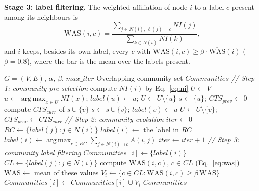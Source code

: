 \documentclass[conference]{IEEEtran}
\newcommand{\algcomment}[1]{\Statex \textit{// #1}}
\DeclareMathOperator*{\argmax}{arg\,max}
\begin{document}
\textbf{Stage 3: label filtering.} The weighted affiliation of node $i$ to a label $c$ present among its neighbours is
\begin{equation}
\mathrm{WAS}(i,c)=\frac{\sum_{j\in N(i),\,\ell(j)=c}NI(j)}{\sum_{k\in N(i)}NI(k)},\label{eq:was}
\end{equation}
and $i$ keeps, besides its own label, every $c$ with $\mathrm{WAS}(i,c)\ge\beta\cdot\overline{\mathrm{WAS}}(i)$ ($\beta=0.8$), where the bar is the mean over the labels present.

\begin{algorithm}[t]
\footnotesize
\caption{TPOC-LPA (baseline, after~\cite{kong2026})}\label{alg:base}
\begin{algorithmic}[1]
\Require $G=(V,E)$, $\alpha$, $\beta$, $max\_iter$
\Ensure Overlapping community set $Communities$
\algcomment{Step 1: community pre-selection}
 compute $NI(i)$ by Eq.~\eqref{eq:ni} \EndFor
\State $U\gets V$
  \State $u\gets\argmax_{x\in U}NI(x)$; $label(u)\gets u$; $U\gets U\setminus\{u\}$
  \State $s\gets\{u\}$; $CTS_{prev}\gets0$
    \State compute $CTS_{curr}$ of $s\cup\{v\}$
      \State $s\gets s\cup\{v\}$; $label(v)\gets u$
      \State $U\gets U\setminus\{v\}$; $CTS_{prev}\gets CTS_{curr}$
    \EndIf
  \EndFor
\EndWhile
\algcomment{Step 2: community evolution}
\State $iter\gets0$
\Repeat
    \State $RC\gets\{label(j):j\in N(i)\}$
     \State $label(i)\gets$ the label in $RC$
    \Else \State $label(i)\gets\argmax_{c\in RC}\sum_{j\in N(i)\cap c}A(i,j)$
    \EndIf
  \EndFor
  \State $iter\gets iter+1$
\algcomment{Step 3: community label filtering}
 $Communities[i]\gets\{label(i)\}$ \EndFor
{}
  \State $CL\gets\{label(j):j\in N(i)\}$
    \State compute $\mathrm{WAS}(i,c)$, $c\in CL$ (Eq.~\eqref{eq:was})
    \State $\overline{\mathrm{WAS}}\gets$ mean of these values
    \State $V_i\gets\{c\in CL:\mathrm{WAS}(i,c)\ge\beta\,\overline{\mathrm{WAS}}\}$
    \State $Communities[i]\gets Communities[i]\cup V_i$
  \EndIf
\EndFor
\State \Return $Communities$
\end{algorithmic}
\end{algorithm}
\end{document}
